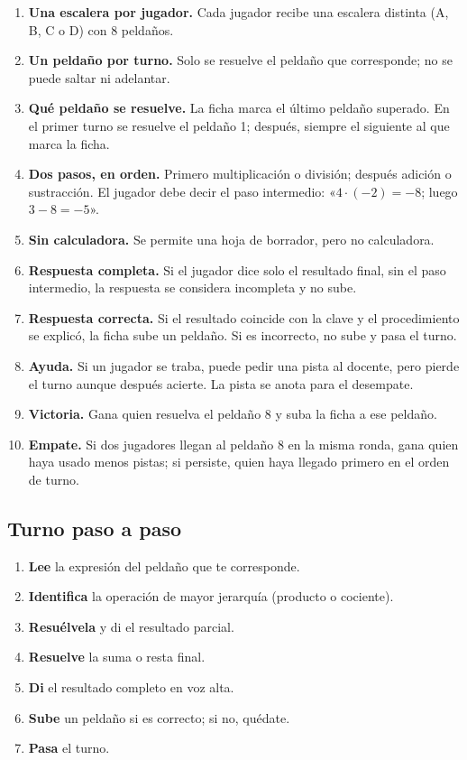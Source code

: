 \documentclass[12pt, letterpaper]{article}
\begin{document}
\begin{enumerate}[leftmargin=*]
  \item \textbf{Una escalera por jugador.} Cada jugador recibe una escalera distinta (A, B, C o D) con 8 peldaños.
  \item \textbf{Un peldaño por turno.} Solo se resuelve el peldaño que corresponde; no se puede saltar ni adelantar.
  \item \textbf{Qué peldaño se resuelve.} La ficha marca el último peldaño superado. En el primer turno se resuelve el peldaño 1; después, siempre el siguiente al que marca la ficha.
  \item \textbf{Dos pasos, en orden.} Primero multiplicación o división; después adición o sustracción. El jugador debe decir el paso intermedio: «$4\cdot(-2)=-8$; luego $3-8=-5$».
  \item \textbf{Sin calculadora.} Se permite una hoja de borrador, pero no calculadora.
  \item \textbf{Respuesta completa.} Si el jugador dice solo el resultado final, sin el paso intermedio, la respuesta se considera incompleta y no sube.
  \item \textbf{Respuesta correcta.} Si el resultado coincide con la clave y el procedimiento se explicó, la ficha sube un peldaño. Si es incorrecto, no sube y pasa el turno.
  \item \textbf{Ayuda.} Si un jugador se traba, puede pedir una pista al docente, pero pierde el turno aunque después acierte. La pista se anota para el desempate.
  \item \textbf{Victoria.} Gana quien resuelva el peldaño 8 y suba la ficha a ese peldaño.
  \item \textbf{Empate.} Si dos jugadores llegan al peldaño 8 en la misma ronda, gana quien haya usado menos pistas; si persiste, quien haya llegado primero en el orden de turno.
\end{enumerate}

\subsection{Turno paso a paso}

\begin{enumerate}[leftmargin=*]
  \item \textbf{Lee} la expresión del peldaño que te corresponde.
  \item \textbf{Identifica} la operación de mayor jerarquía (producto o cociente).
  \item \textbf{Resuélvela} y di el resultado parcial.
  \item \textbf{Resuelve} la suma o resta final.
  \item \textbf{Di} el resultado completo en voz alta.
  \item \textbf{Sube} un peldaño si es correcto; si no, quédate.
  \item \textbf{Pasa} el turno.
\end{enumerate}
\end{document}
